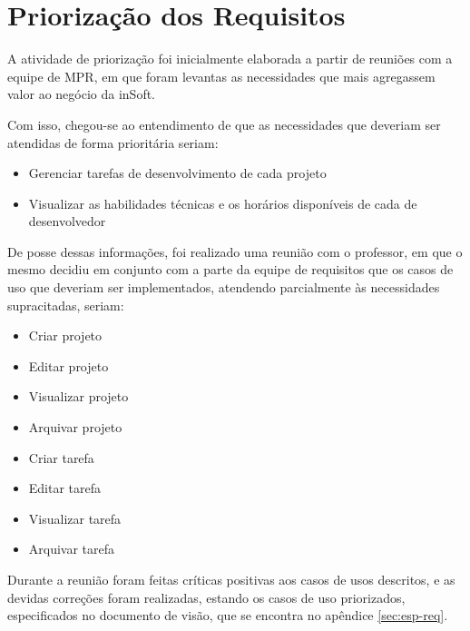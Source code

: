 \section{Priorização dos Requisitos}
\label{sec:priorizacao}

A atividade de priorização foi inicialmente elaborada a partir de reuniões com a equipe de MPR, em que foram levantas as necessidades que mais agregassem valor ao negócio da inSoft.

Com isso, chegou-se ao entendimento de que as necessidades que deveriam ser atendidas de forma prioritária seriam:

\begin{itemize}
  \item Gerenciar tarefas de desenvolvimento de cada projeto
  \item Visualizar as habilidades técnicas e os horários disponíveis de cada de desenvolvedor
\end{itemize}

De posse dessas informações, foi realizado uma reunião com o professor, em que o mesmo decidiu em conjunto com a parte da equipe de requisitos que os casos de uso que deveriam ser implementados, atendendo parcialmente às necessidades supracitadas, seriam:

\begin{itemize}
  \item Criar projeto
  \item Editar projeto
  \item Visualizar projeto
  \item Arquivar projeto
  \item Criar tarefa
  \item Editar tarefa
  \item Visualizar tarefa
  \item Arquivar tarefa
\end{itemize}

Durante a reunião foram feitas críticas positivas aos casos de usos descritos, e as devidas correções foram realizadas, estando os casos de uso priorizados, especificados no documento de visão, que se encontra no apêndice \ref{sec:esp-req}.
